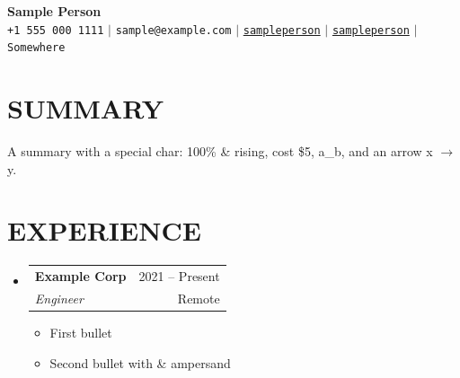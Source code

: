 \documentclass[letterpaper,11pt]{article}
\makeatletter
\newcommand{\resumeItem}[1]{\item\small{{#1 \vspace{-1pt}}}}
\newcommand{\resumeSubheading}[4]{\vspace{-1pt}\item
  \begin{tabular*}{\textwidth}[t]{l@{\extracolsep{\fill}}r}
    \textbf{#1} & {\color{dark-grey}\small #2}\vspace{1pt}\\
    \textit{#3} & {\color{dark-grey} \small #4}\\
  \end{tabular*}\vspace{-4pt}}
\newcommand{\resumeSubHeadingListStart}{\begin{itemize}[leftmargin=0in, label={}]}
\newcommand{\resumeSubHeadingListEnd}{\end{itemize}}
\newcommand{\resumeItemListStart}{\begin{itemize}}
\newcommand{\resumeItemListEnd}{\end{itemize}\vspace{0pt}}
\makeatother
\begin{document}
\begin{center}
    \textbf{\Huge Sample Person} \\ \vspace{5pt}
    \small \faPhone* \texttt{+1 555 000 1111} \hspace{1pt} $|$ \hspace{1pt} \faEnvelope \hspace{2pt} \texttt{sample@example.com} \hspace{1pt} $|$ \hspace{1pt} \faLinkedin \hspace{2pt} \href{https://www.linkedin.com/in/sampleperson}{\texttt{sampleperson}} \hspace{1pt} $|$ \hspace{1pt} \faGithub \hspace{2pt} \href{https://github.com/sampleperson}{\texttt{sampleperson}} \hspace{1pt} $|$ \hspace{1pt} \faMapMarker* \hspace{2pt}\texttt{Somewhere}
    \\ \vspace{-3pt}
\end{center}

\section{SUMMARY}
\small{A summary with a special char: 100\% \& rising, cost \$5, a\_b, and an arrow x $\rightarrow$ y.}
\vspace{4pt}

\section{EXPERIENCE}
  \resumeSubHeadingListStart
    \resumeSubheading
      {Example Corp}{2021 -- Present}
      {Engineer}{Remote}
      \resumeItemListStart
        \resumeItem{First bullet}
        \resumeItem{Second bullet with \& ampersand}
      \resumeItemListEnd
  \resumeSubHeadingListEnd
\end{document}

